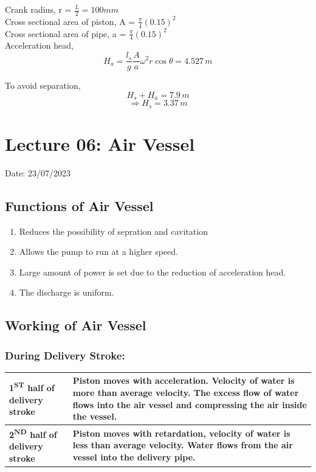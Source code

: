 \documentclass{article}
\begin{document}
\begin{multicols}{2}
      Crank radius, r = $\frac{L}{2} = 100 mm$ \\
      Cross sectional area of piston, A = $\frac{\pi}{4} (0.15)^2$ \\ 
      Cross sectional area of pipe, a = $\frac{\pi}{4} (0.15)^2$\\
      Acceleration head, $$H_a = \frac{l_s}{g} \frac{A}{a} \omega^2 r \cos \theta = 4.527 \, m $$
      
      To avoid separation,
      $$H_s + H_a = 7.9 \, m$$
      $$\Rightarrow H_s = 3.37 \, m$$
    \end{multicols}
    \vspace*{1cm}
    \hrulefill

    \section{Lecture 06: Air Vessel} 
    \hfill Date: 23/07/2023

    \subsection*{Functions of Air Vessel}
    \begin{enumerate}
      \item Reduces the possibility of sepration and cavitation 
      \item Allows the pump to run at a higher speed. 
      \item Large amount of power is set due to the reduction of acceleration head.
      \item The discharge is uniform. 
    \end{enumerate}

    \subsection*{Working of Air Vessel}
    \subsubsection*{During Delivery Stroke:}

    \begin{table}[ht]
      \centering
      \renewcommand{\arraystretch}{2.5} 
      \begin{tabularx}{\textwidth}{>{\hsize=0.4\hsize\centering\arraybackslash}X>{\hsize=0.6\hsize\centering\arraybackslash}X}
        \hline
        \textbf{1\textsuperscript{ST} half of delivery stroke} & \textbf{Piston moves with acceleration. Velocity of water is more than average velocity. The excess flow of water flows into the air vessel and compressing the air inside the vessel.} \\
        \hline
        \textbf{2\textsuperscript{ND} half of delivery stroke} & \textbf{Piston moves with retardation, velocity of water is less than average velocity. Water flows from the air vessel into the delivery pipe.} \\
        \hline
      \end{tabularx}
    \end{table}
\end{document}
